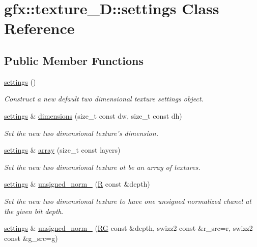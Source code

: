 \hypertarget{classgfx_1_1texture__2D_1_1settings}{\section{gfx\-:\-:texture\-\_\-D\-:\-:settings Class Reference}
\label{classgfx_1_1texture__2D_1_1settings}
}
\subsection*{Public Member Functions}
\begin{DoxyCompactItemize}
\item 
\hyperlink{classgfx_1_1texture__2D_1_1settings_a81ffa017556036072c1dbdb4fa6a9183}{settings} ()
\begin{DoxyCompactList}\small\item\em Construct a new default two dimensional texture settings object. \end{DoxyCompactList}\item 
\hyperlink{classgfx_1_1texture__2D_1_1settings}{settings} \& \hyperlink{classgfx_1_1texture__2D_1_1settings_a2100d9aa5ff24595ad8d0d45f895c04b}{dimensions} (size\-\_\-t const dw, size\-\_\-t const dh)
\begin{DoxyCompactList}\small\item\em Set the new two dimensional texture's dimension. \end{DoxyCompactList}\item 
\hyperlink{classgfx_1_1texture__2D_1_1settings}{settings} \& \hyperlink{classgfx_1_1texture__2D_1_1settings_ab0edc85407f274f93ff39b5edacff983}{array} (size\-\_\-t const layers)
\begin{DoxyCompactList}\small\item\em Set the new two dimensional texture ot be an array of textures. \end{DoxyCompactList}\item 
\hyperlink{classgfx_1_1texture__2D_1_1settings}{settings} \& \hyperlink{classgfx_1_1texture__2D_1_1settings_a91f9d51729103bbbb376ebd9ecda59c9}{unsigned\-\_\-norm\-\_} (\hyperlink{classgfx_1_1R}{R} const \&depth)
\begin{DoxyCompactList}\small\item\em Set the new two dimensional texture to have one unsigned normalized chanel at the given bit depth. \end{DoxyCompactList}\item 
\hyperlink{classgfx_1_1texture__2D_1_1settings}{settings} \& \hyperlink{classgfx_1_1texture__2D_1_1settings_a08878a7774af4f3834e3ec1cd08db9ea}{unsigned\-\_\-norm\-\_} (\hyperlink{classgfx_1_1RG}{R\-G} const \&depth, swizz2 const \&r\-\_\-src=r, swizz2 const \&g\-\_\-src=g)

\end{DoxyCompactItemize}
